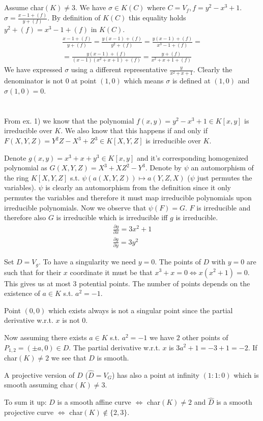 \documentclass[12pt, a4paper]{article}
\begin{document}
\section{}
Assume char$(K) \neq 3$. We have $\sigma \in K(C)$ where $C = V_f, f = y^2-x^3+1$. $\sigma = \frac{x-1+(f)}{y+(f)}$. By definition of $K(C)$ this equality holds $y^2+(f)=x^3-1+(f)$ in $K(C)$.
\begin{gather*}
\frac{x-1+(f)}{y+(f)} = \frac{y(x-1)+(f)}{y^2+(f)} = \frac{y(x-1)+(f)}{x^3-1+(f)} = \\
=\frac{y(x-1)+(f)}{(x-1)(x^2+x+1)+(f)} = \frac{y + (f)}{x^2+x+1+(f)}
\end{gather*}
We have expressed $\sigma$ using a different representative $\frac{y}{x^2+x+1}$. Clearly the denominator is not $0$ at point $(1,0)$ which means $\sigma$ is defined at $(1,0)$ and $\sigma(1,0)=0$.

\section{}
From ex. 1) we know that the polynomial $f(x,y) = y^2-x^3+1 \in K[x,y]$ is irreducible over $K$. We also know that this happens if and only if $F(X,Y,Z) = Y^2Z-X^3+Z^3 \in K[X,Y,Z]$ is irreducible over $K$. 

Denote $g(x,y) = x^3+x+y^3 \in K[x,y]$ and it's corresponding homogenized polynomial as $G(X,Y,Z) = X^3+XZ^2-Y^3$. Denote by $\psi$ an automorphism of the ring $K[X,Y,Z]$ s.t. $\psi(a(X,Y,Z)) \mapsto a(Y,Z,X)$ ($\psi$ just permutes the variables). $\psi$ is clearly an automorphism from the definition since it only permutes the variables and therefore it must map irreducible polynomials upon irreducible polynomials. Now we observe that $\psi(F) = G$. $F$ is irreducible and therefore also $G$ is irreducible which is irreducible iff $g$ is irreducible.
\begin{gather*}
\frac{\partial g}{\partial x} = 3x^2+1\\
\frac{\partial g}{\partial y} = 3y^2
\end{gather*}

Set $D=V_g$. To have a singularity we need $y=0$. The points of $D$ with $y=0$ are such that for their $x$ coordinate it must be that $x^3+x=0 \iff x(x^2+1)=0$. This gives us at most 3 potential points. The number of points depends on the existence of $a \in K$ s.t. $a^2 = -1$. 

Point $(0,0)$ which exists always is not a singular point since the partial derivative w.r.t. $x$ is not $0$.

Now assuming there exists $a \in K$ s.t. $a^2=-1$ we have $2$ other points of $P_{1,2}=(\pm a, 0) \in D$. The partial derivative w.r.t. $x$ is $3a^2+1 = -3+1 = -2$. If char$(K)\neq 2$ we see that $D$ is smooth.

A projective version of $D$ ($\hat{D} = V_G$) has also a point at infinity $(1:1:0)$ which is smooth assuming char$(K)\neq 3$.

To sum it up: $D$ is a smooth affine curve $\iff$ char$(K) \neq 2$ and $\hat{D}$ is a smooth projective curve $\iff$ char$(K)\notin \{2,3\}$.
\end{document}
